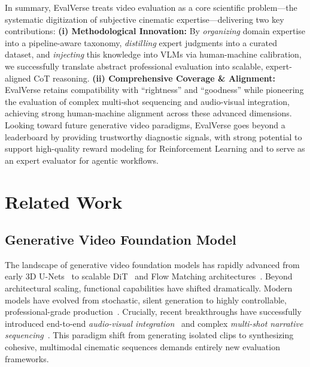 \documentclass{article}
\begin{document}
In summary, EvalVerse treats video evaluation as a core scientific problem—the systematic digitization of subjective cinematic expertise—delivering two key contributions: \textbf{(i) Methodological Innovation:} By \textit{organizing} domain expertise into a pipeline-aware taxonomy, \textit{distilling} expert judgments into a curated dataset, and \textit{injecting} this knowledge into VLMs via human-machine calibration, we successfully translate abstract professional evaluation into scalable, expert-aligned CoT reasoning. \textbf{(ii) Comprehensive Coverage \& Alignment:} EvalVerse retains compatibility with ``rightness'' and ``goodness'' while pioneering the evaluation of complex multi-shot sequencing and audio-visual integration, achieving strong human-machine alignment across these advanced dimensions. Looking toward future generative video paradigms, EvalVerse goes beyond a leaderboard by providing trustworthy diagnostic signals, with strong potential to support high-quality reward modeling for Reinforcement Learning and to serve as an expert evaluator for agentic workflows.

\section{Related Work}

\subsection{Generative Video Foundation Model}

The landscape of generative video foundation models has rapidly advanced from early 3D U-Nets~\cite{svd} to scalable DiT~\cite{dit} and Flow Matching architectures~\cite{wan, hunyuanvideo}. Beyond architectural scaling, functional capabilities have shifted dramatically. Modern models have evolved from stochastic, silent generation to highly controllable, professional-grade production~\cite{cogvideox, luma}. Crucially, recent breakthroughs have successfully introduced end-to-end \textit{audio-visual integration}~\cite{sora2, ltx, kling, seedance2} and complex \textit{multi-shot narrative sequencing}~\cite{guo2025longcontexttuning, holocine, multishotmaster}. This paradigm shift from generating isolated clips to synthesizing cohesive, multimodal cinematic sequences demands entirely new evaluation frameworks.


\end{document}
